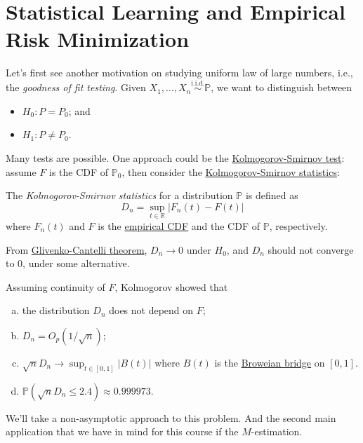 \chapter{Statistical Learning and Empirical Risk Minimization}
Let's first see another motivation on studying uniform law of large numbers, i.e., the \emph{goodness of fit testing}. Given \(X_1, \dots , X_n \overset{\text{i.i.d.}}{\sim } \mathbb{P} \), we want to distinguish between
\begin{itemize}
	\item \(H_0 \colon P = P_0\); and
	\item \(H_1\colon P \neq P_0\).
\end{itemize}
Many tests are possible. One approach could be the \href{https://en.wikipedia.org/wiki/Kolmogorov-Smirnov_test}{Kolmogorov-Smirnov test}: assume \(F\) is the CDF of \(\mathbb{P} _0\), then consider the \hyperref[def:Kolmogorov-Smirnov-statistics]{Kolmogorov-Smirnov statistics}:

\begin{definition}\label{def:Kolmogorov-Smirnov-statistics}
	The \emph{Kolmogorov-Smirnov statistics} for a distribution \(\mathbb{P} \) is defined as
	\[
		D_n = \sup _{t\in \mathbb{R} } \vert F_n(t) - F(t) \vert
	\]
	where \(F_n(t)\) and \(F\) is the \hyperref[def:empirical-CDF]{empirical CDF} and the CDF of \(\mathbb{P} \), respectively.
\end{definition}

From \href{https://en.wikipedia.org/wiki/Glivenko-Cantelli_theorem}{Glivenko-Cantelli theorem}, \(D_n \to 0\) under \(H_0\), and \(D_n\) should not converge to \(0\), under some alternative.

Assuming continuity of \(F\), Kolmogorov showed that
\begin{enumerate}[(a)]
	\item the distribution \(D_n\) does not depend on \(F\);
	\item \(D_n = O_p(1 / \sqrt{n} )\);
	\item \(\sqrt{n} D_n \to \sup _{t\in [0, 1]} \vert B(t) \vert \) where \(B(t)\) is the \href{https://en.wikipedia.org/wiki/Brownian_bridge}{Broweian bridge} on \([0, 1]\).
	\item \(\mathbb{P} (\sqrt{n}D_n  \leq 2.4) \approx 0.999973\).
\end{enumerate}
We'll take a non-asymptotic approach to this problem. And the second main application that we have in mind for this course if the \(M\)-estimation.

